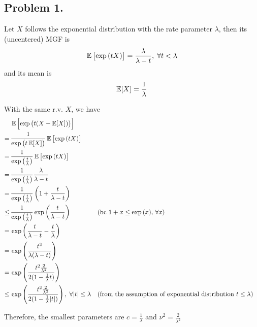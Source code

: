 

\subsection*{Problem 1.}

Let $X$ follows the exponential distribution with the rate parameter $\lambda$, then its (uncentered) MGF is
\begin{align*}
  \EE\sbr{\exp \del{tX}} = \frac{ \lambda }{\lambda - t}, \; \forall t < \lambda
\end{align*}
and its mean is
\begin{align*}
  \operatorname{\mathbb{E}}[X] = \frac{1}{\lambda}
\end{align*}

With the same r.v. $X$, we have
\begin{align*}
  &\EE\sbr{\exp \del{t(X - \EE[X])}} \\
  \stackrel{}{=}\,&\frac{1}{\exp\del{t\EE[X]}}\EE\sbr{\exp \del{tX}} \\
  \stackrel{}{=}\,&\frac{1}{\exp\del{\frac{t}{\lambda}}}\EE\sbr{\exp \del{tX}} \\
  \stackrel{}{=}\,&\frac{1}{\exp\del{\frac{t}{\lambda}}}\frac{\lambda}{\lambda-t} \\
  \stackrel{}{=}\,&\frac{1}{\exp\del{\frac{t}{\lambda}}}\del{1+\frac{t}{\lambda-t}} \\
  \stackrel{}{\le}\,&\frac{1}{\exp\del{\frac{t}{\lambda}}}\exp\del{\frac{t}{\lambda-t}} && \mcmt{bc $1 + x \le \exp\del{x}$, $\forall x$} \\
  \stackrel{}{=}\,&\exp\del{\frac{t}{\lambda-t} - \frac{t}{\lambda}}  \\
  \stackrel{}{=}\,&\exp\del{\frac{t^2}{\lambda(\lambda-t)}} \\
  \stackrel{}{=}\,&\exp\del{\frac{t^2\frac{2}{\lambda^2}}{2(1-\frac{1}{\lambda}t)}} \\
  \stackrel{}{\le}\,&\exp\del{\frac{t^2\frac{2}{\lambda^2}}{2(1-\frac{1}{\lambda}\abs{t})}},\; \forall \abs{t} \le \lambda && \mcmt{from the assumption of exponential distribution $t \le \lambda$} \\
\end{align*}

Therefore, the smallest parameters are $c = \frac{1}{\lambda}$ and $\nu^2 = \frac{2}{\lambda^2}$

